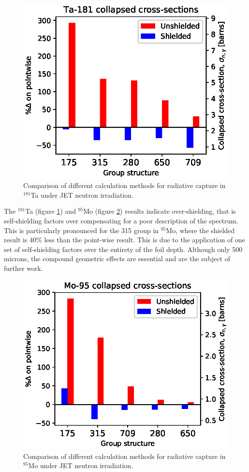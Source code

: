 \begin{figure}[H]
  \centering
  \includegraphics[width=\linewidth]{Ta-181.eps}
  \caption{Comparison of different calculation methods for radiative capture in $^{181}$Ta under JET neutron irradiation.}
  \label{fig:tantalum-181}
\end{figure}

The $^{181}$Ta (figure \ref{fig:tantalum-181}) and $^{95}$Mo (figure \ref{fig:molybdenum-95}) results indicate over-shielding, that is self-shielding factors over compensating for a poor description of the spectrum. This is particularly pronounced for the 315 group in $^{95}$Mo, where the shielded result is 40\% less than the point-wise result. This is due to the application of one set of self-shielding factors over the entirety of the foil depth. Although only 500 microns, the compound geometric effects are essential and are the subject of further work.

\begin{figure}[H]
  \centering
  \includegraphics[width=\linewidth]{Mo-95.eps}
  \caption{Comparison of different calculation methods for radiative capture in $^{95}$Mo under JET neutron irradiation.}
  \label{fig:molybdenum-95}
\end{figure}

